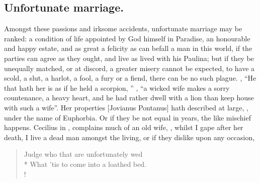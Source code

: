 
\subsection{Unfortunate marriage.}

Amongst these passions and irksome accidents, unfortunate marriage may be
ranked: a condition of life appointed by God himself in Paradise, an honourable
and happy estate, and as great a felicity as can befall a man in this world,
if the parties can agree as they ought, and live as
\Seneca{} lived with his Paulina; but if they be unequally
matched, or at discord, a greater misery cannot be expected, to have a scold, a
slut, a harlot, a fool, a fury or a fiend, there can be no such plague.
, \enquote{He that hath her is as if he held a scorpion,
\etc{}} , \enquote{a wicked wife makes a sorry countenance, a heavy
heart, and he had rather dwell with a lion than keep house with such a wife}.
Her properties [Jovianus Pontanus] hath described at large,
, under the name of Euphorbia. Or if
they be not equal in years, the like mischief happens. Cecilius in
, complains much of an old wife,
, whilst I gape after
her death, I live a dead man amongst the living, or if they dislike upon any
occasion,

\begin{verse}%
Judge who that are unfortunately wed\\*
What 'tis to come into a loathed bed.\\!
\end{verse}%


